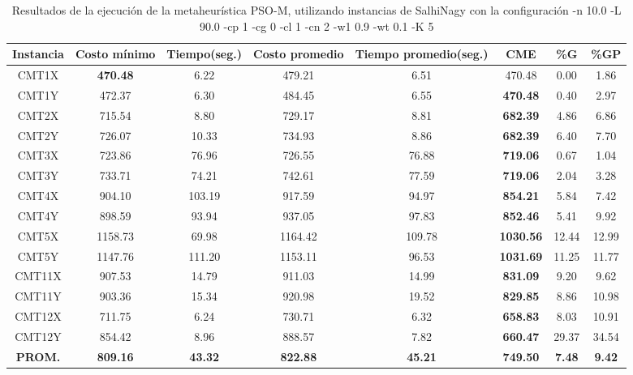 \begin{table}[h]
\caption{Resultados de la ejecución de la metaheurística PSO-M, utilizando instancias de SalhiNagy con la configuración -n 10.0 -L 90.0 -cp 1 -cg 0 -cl 1 -cn 2 -w1 0.9 -wt 0.1 -K 5}
\centering
\small
\begin{tabular}{c c c c c c c c}
\hline\hline
Instancia & Costo mínimo & Tiempo(seg.) & Costo promedio & Tiempo promedio(seg.) & CME & \%G & \%GP \\ [0.5ex]
\hline
CMT1X & \bf{470.48} & 6.22 & 
479.21 & 6.51 & 470.48 & 0.00
 & 1.86\\CMT1Y & 472.37 & 6.30 & 
484.45 & 6.55 & \bf{470.48} & 
0.40 & 2.97\\CMT2X & 715.54 & 8.80 & 
729.17 & 8.81 & \bf{682.39} & 
4.86 & 6.86\\CMT2Y & 726.07 & 10.33 & 
734.93 & 8.86 & \bf{682.39} & 
6.40 & 7.70\\CMT3X & 723.86 & 76.96 & 
726.55 & 76.88 & \bf{719.06} & 
0.67 & 1.04\\CMT3Y & 733.71 & 74.21 & 
742.61 & 77.59 & \bf{719.06} & 
2.04 & 3.28\\CMT4X & 904.10 & 103.19 & 
917.59 & 94.97 & \bf{854.21} & 
5.84 & 7.42\\CMT4Y & 898.59 & 93.94 & 
937.05 & 97.83 & \bf{852.46} & 
5.41 & 9.92\\CMT5X & 1158.73 & 69.98 & 
1164.42 & 109.78 & \bf{1030.56} & 
12.44 & 12.99\\CMT5Y & 1147.76 & 111.20 & 
1153.11 & 96.53 & \bf{1031.69} & 
11.25 & 11.77\\CMT11X & 907.53 & 14.79 & 
911.03 & 14.99 & \bf{831.09} & 
9.20 & 9.62\\CMT11Y & 903.36 & 15.34 & 
920.98 & 19.52 & \bf{829.85} & 
8.86 & 10.98\\CMT12X & 711.75 & 6.24 & 
730.71 & 6.32 & \bf{658.83} & 
8.03 & 10.91\\CMT12Y & 854.42 & 8.96 & 
888.57 & 7.82 & \bf{660.47} & 
29.37 & 34.54\\\bf{PROM.} & 
\bf{809.16} & \bf{43.32} & \bf{822.88} & \bf{45.21} & \bf{749.50} & \bf{7.48} & \bf{9.42}\\[1ex]\hline
\end{tabular}
\label{table:nonlin}
\end{table}
